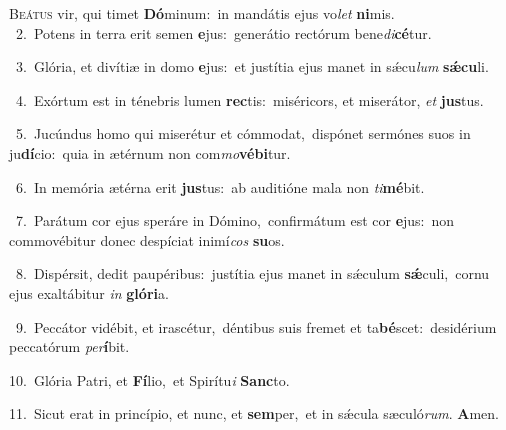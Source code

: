 \lettrine{\initial\textcolor{\initialcolor}{B}}{eátus} vir, qui timet \textbf{Dó}\-minum:~\star in mandátis ejus vo\textit{let} \textbf{ni}\-mis.\\
{\numbfont\textcolor{\numbcolor}{~2.}}~Potens in terra erit semen \textbf{e}\-jus:~\star generátio rectórum bene\-\textit{di}\-\textbf{cé}tur.\par
{\numbfont\textcolor{\numbcolor}{~3.}}~Glória, et divítiæ in domo \textbf{e}\-jus:~\star et justítia ejus manet in sǽcu\textit{lum} \textbf{sǽ}\-\textbf{cu}li.\par
{\numbfont\textcolor{\numbcolor}{~4.}}~Exórtum est in ténebris lumen \textbf{rec}\-tis:~\star miséricors, et miserátor, \textit{et} \textbf{jus}\-tus.\par
{\numbfont\textcolor{\numbcolor}{~5.}}~Jucúndus homo qui miserétur et cómmodat,~\dagger dispónet sermónes suos in ju\-\textbf{dí}\-cio:~\star quia in ætérnum non com\-\textit{mo}\-\textbf{vé}\textbf{bi}tur.\par
{\numbfont\textcolor{\numbcolor}{~6.}}~In memória ætérna erit \textbf{jus}\-tus:~\star ab auditióne mala non \textit{ti}\-\textbf{mé}bit.\par
{\numbfont\textcolor{\numbcolor}{~7.}}~Parátum cor ejus speráre in Dómino,~\dagger confirmátum est cor \textbf{e}\-jus:~\star non commovébitur donec despíciat inimí\textit{cos} \textbf{su}\-os.\par
{\numbfont\textcolor{\numbcolor}{~8.}}~Dispérsit, dedit paupéribus:~\dagger justítia ejus manet in sǽculum \textbf{sǽ}\-culi,~\star cornu ejus exaltábitur \textit{in} \textbf{gló}\-\textbf{ri}a.\par
{\numbfont\textcolor{\numbcolor}{~9.}}~Peccátor vidébit, et irascétur,~\dagger déntibus suis fremet et ta\-\textbf{bé}\-scet:~\star desidérium peccatórum \textit{per}\-\textbf{í}bit.\par
{\numbfont\textcolor{\numbcolor}{10.}}~Glória Patri, et \textbf{Fí}\-lio,~\star et Spirítu\textit{i} \textbf{Sanc}\-to.\par
{\numbfont\textcolor{\numbcolor}{11.}}~Sicut erat in princípio, et nunc, et \textbf{sem}\-per,~\star et in sǽcula sæculó\-\textit{rum}\-. \textbf{A}\-men.\par
